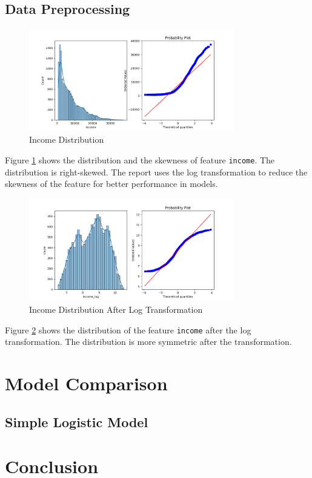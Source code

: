\documentclass[10pt]{article} %
\begin{document}
    \subsection{Data Preprocessing}
    \begin{figure}
        \centering
        \includegraphics[width=0.8\textwidth]{"../fig/income_distribution.png"}
        \caption{Income Distribution}
        \label{fig:income_skew}
    \end{figure}
    Figure \ref{fig:income_skew} shows the distribution and the skewness of feature \texttt{income}. The distribution is right-skewed. The report uses the log transformation to reduce the skewness of the feature for better performance in models.
    \begin{figure}
        \centering
        \includegraphics[width=0.8\textwidth]{"../fig/income_distribution_log_transform.png"}
        \caption{Income Distribution After Log Transformation}
        \label{fig:income_log}
    \end{figure}
    Figure \ref{fig:income_log} shows the distribution of the feature \texttt{income} after the log transformation. The distribution is more symmetric after the transformation.

\section{Model Comparison}
    \subsection{Simple Logistic Model}


\section{Conclusion}

\newpage
\footnotesize


\end{document}
